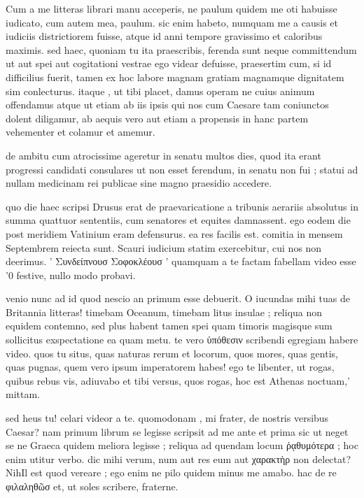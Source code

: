 


 Cum a me litteras librari manu acceperis, ne paulum quidem me oti habuisse iudicato, cum autem mea, paulum. sic enim habeto, numquam me a causis et iudiciis districtiorem fuisse, atque id anni tempore gravissimo et caloribus maximis. sed haec, quoniam tu ita praescribis, ferenda sunt neque committendum ut aut spei aut cogitationi vestrae ego videar defuisse, praesertim cum, si id difficilius fuerit, tamen ex hoc labore magnam gratiam magnamque dignitatem sim conlecturus. itaque , ut tibi placet, damus operam ne cuius animum offendamus atque ut etiam ab iis ipsis qui nos cum Caesare tam coniunctos dolent diligamur, ab aequis vero aut etiam a propensis in hanc partem vehementer et colamur et amemur.

 de ambitu cum atrocissime ageretur in senatu multos dies, quod ita erant progressi candidati consulares ut non esset ferendum, in senatu non fui ; statui ad nullam medicinam rei publicae sine magno praesidio accedere.

 quo die haec scripsi Drusus erat de praevaricatione a tribunis aerariis absolutus in summa quattuor sententiis, cum senatores et equites damnassent. ego eodem die post meridiem Vatinium eram defensurus. ea res facilis est. comitia in mensem Septembrem reiecta sunt. Scauri iudicium statim exercebitur, cui nos non deerimus. ' Συνδείπνουσ Σοφοκλέουσ ' quamquam a te factam fabellam video esse '0 festive, nullo modo probavi.

 venio nunc ad id quod nescio an primum esse debuerit. O iucundas mihi tuas de Britannia litteras! timebam Oceanum, timebam litus insulae ; reliqua non equidem contemno, sed plus habent tamen spei quam timoris magisque sum sollicitus exspectatione ea quam metu. te vero ὑπόθεσιν scribendi egregiam habere video. quos tu situs, quas naturas rerum et locorum, quos mores, quas gentis, quas pugnas, quem vero ipsum imperatorem habes! ego te libenter, ut rogas, quibus rebus vis, adiuvabo et tibi versus, quos rogas, hoc est Athenas noctuam,' mittam.

 sed heus tu! celari videor a te. quomodonam , mi frater, de nostris versibus Caesar? nam primum librum se legisse scripsit ad me ante et prima sic ut neget se ne Graeca quidem meliora legisse ; reliqua ad quendam locum ῤᾳθυμότερα ; hoc enim utitur verbo. dic mihi verum, num aut res eum aut χαρακτὴρ non delectat? NihIl est quod vereare ; ego enim ne pilo quidem minus me amabo. hac de re φιλαληθῶσ et, ut soles scribere, fraterne.
